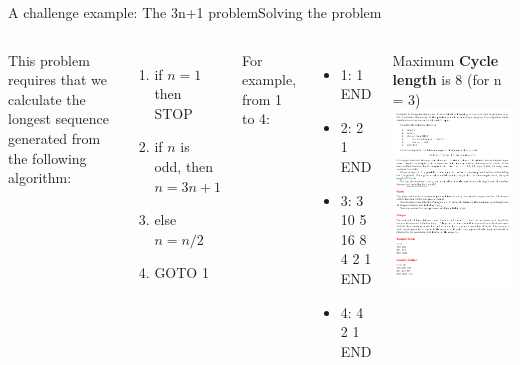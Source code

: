 \begin{frame}{A challenge example: The 3n+1 problem}{Solving the problem}
  \begin{columns}
    This problem requires that we calculate the longest sequence generated
    from the following algorithm:
      \begin{enumerate}
        \item if $n = 1$ then STOP
        \item if $n$ is odd, then $n = 3n + 1$
        \item else $n = n/2$
        \item GOTO 1
      \end{enumerate}
    \medskip

    For example, from 1 to 4:
    \begin{itemize}
      \item 1: 1 END
      \item 2: 2 1 END
      \item 3: 3 10 5 16 8 4 2 1 END
      \item 4: 4 2 1 END
    \end{itemize}
    Maximum {\bf Cycle length} is 8 (for n = 3)
    \includegraphics[width=1\textwidth]{img/3n_problem}
  \end{columns}
\end{frame}

